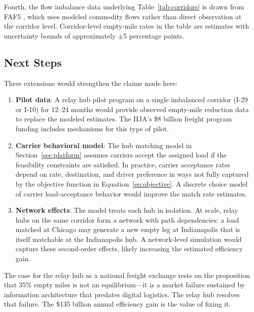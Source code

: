 Fourth, the flow imbalance data underlying Table~\ref{tab:corridors} is drawn from FAF5 \citep{FAF5_2023}, which uses modeled commodity flows rather than direct observation at the corridor level. Corridor-level empty-mile rates in the table are estimates with uncertainty bounds of approximately $\pm$5 percentage points.

\subsection{Next Steps}

Three extensions would strengthen the claims made here:

\begin{enumerate}
  \item \textbf{Pilot data}: A relay hub pilot program on a single imbalanced corridor (I-29 or I-10) for 12--24 months would provide observed empty-mile reduction data to replace the modeled estimates. The IIJA's \$8 billion freight program funding includes mechanisms for this type of pilot.

  \item \textbf{Carrier behavioral model}: The hub matching model in Section~\ref{sec:platform} assumes carriers accept the assigned load if the feasibility constraints are satisfied. In practice, carrier acceptance rates depend on rate, destination, and driver preference in ways not fully captured by the objective function in Equation~\ref{eq:objective}. A discrete choice model of carrier load-acceptance behavior would improve the match rate estimates.

  \item \textbf{Network effects}: The model treats each hub in isolation. At scale, relay hubs on the same corridor form a network with path dependencies: a load matched at Chicago may generate a new empty leg at Indianapolis that is itself matchable at the Indianapolis hub. A network-level simulation would capture these second-order effects, likely increasing the estimated efficiency gain.
\end{enumerate}

The case for the relay hub as a national freight exchange rests on the proposition that 35\% empty miles is not an equilibrium---it is a market failure sustained by information architecture that predates digital logistics. The relay hub resolves that failure. The \$135 billion annual efficiency gain is the value of fixing it.
